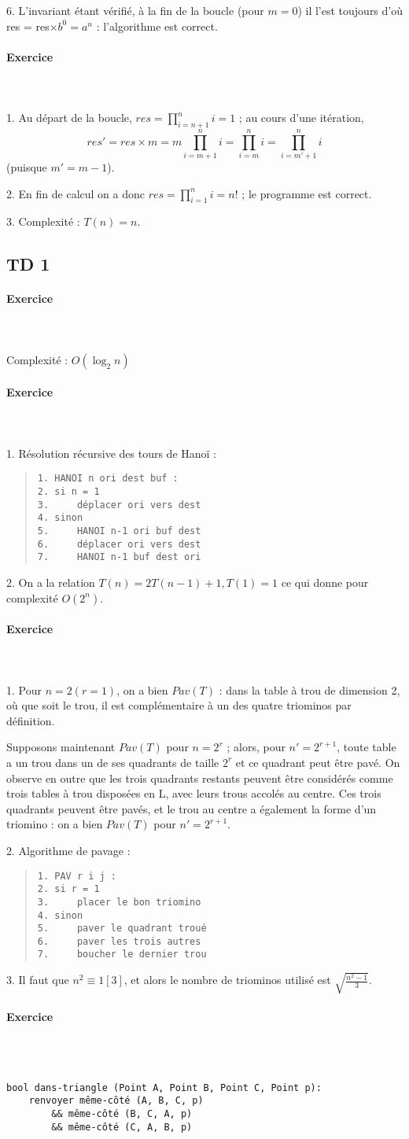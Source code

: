 \documentclass[a4paper]{article}
\newcounter{noexo}
\newcommand{\exo}{\stepcounter{noexo} \paragraph{Exercice \thenoexo} ~\\ ~\\}
\begin{document}
6. L'invariant étant vérifié, à la fin de la boucle (pour $m=0$) il l'est toujours d'où res = res$\times b^0 = a^n$ : l'algorithme est correct.

\exo
1. Au départ de la boucle, $res=\prod_{i=n+1}^{n}i=1$ ; au cours d'une itération, $$res'=res\times m=m\prod_{i=m+1}^{n}i=\prod_{i=m}^{n}i=\prod_{i=m'+1}^{n}i$$ (puisque $m'=m-1$).

2. En fin de calcul on a donc $res=\prod_{i=1}^{n}i=n!$ ; le programme est correct.

3. Complexité : $T(n)=n$.

\subsection*{TD 1}
\setcounter{noexo}{0}

\exo
Complexité : $O(\log_2 n)$

\exo
1. Résolution récursive des tours de Hanoï :
\begin{quote}\begin{verbatim}
1. HANOI n ori dest buf :
2. si n = 1
3.     déplacer ori vers dest
4. sinon
5.     HANOI n-1 ori buf dest
6.     déplacer ori vers dest
7.     HANOI n-1 buf dest ori
\end{verbatim}\end{quote}

2. On a la relation $T(n)=2T(n-1)+1, T(1)=1$ ce qui donne pour complexité $O(2^n)$.

\exo
1. Pour $n=2 (r=1)$, on a bien $Pav(T)$ : dans la table à trou de dimension 2, où que soit le trou, il est complémentaire à un des quatre triominos par définition.

Supposons maintenant $Pav(T)$ pour $n=2^r$ ; alors, pour $n'=2^{r+1}$, toute table a un trou dans un de ses quadrants de taille $2^r$ et ce quadrant peut être pavé. On observe en outre que les trois quadrants restants peuvent être considérés comme trois tables à trou disposées en L, avec leurs trous accolés au centre. Ces trois quadrants peuvent être pavés, et le trou au centre a également la forme d'un triomino : on a bien $Pav(T)$ pour $n'=2^{r+1}$.

2. Algorithme de pavage :
\begin{quote}\begin{verbatim}
1. PAV r i j :
2. si r = 1
3.     placer le bon triomino
4. sinon
5.     paver le quadrant troué
6.     paver les trois autres 
7.     boucher le dernier trou
\end{verbatim}\end{quote}

3. Il faut que $n^2\equiv 1[3]$, et alors le nombre de triominos utilisé est $\sqrt{\frac{n^2-1}{3}}$.

\exo
\begin{verbatim}
bool dans-triangle (Point A, Point B, Point C, Point p):
    renvoyer même-côté (A, B, C, p)
        && même-côté (B, C, A, p)
        && même-côté (C, A, B, p)
\end{verbatim}
\end{document}
